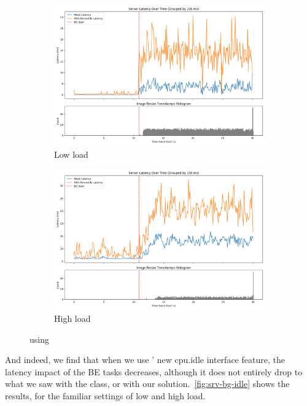 \begin{figure}[t]
    \centering
    \begin{subfigure}[t]{0.49\columnwidth}
        \includegraphics[width=\columnwidth]{graphs/srv-bg-idle-low.png}
        \caption{Low load}\label{fig:srv-bg-idle-low}
    \end{subfigure}
    \hspace{\fill}
    \begin{subfigure}[t]{0.49\columnwidth}
        \includegraphics[width=\columnwidth]{graphs/srv-bg-idle-high.png}
        \caption{High load}\label{fig:srv-bg-idle-high}
    \end{subfigure}
    \vspace{4pt}
    \caption{using \schedidle{}}\label{fig:srv-bg-idle}
\end{figure}

And indeed, we find that when we use \cgroups{}' new cpu.idle interface feature,
the latency impact of the BE tasks decreases, although it does not entirely drop
to what we saw with the \fifoclass{} class, or with our \schedbe{} solution.\
\autoref{fig:srv-bg-idle} shows the results, for the familiar settings of low
and high load.